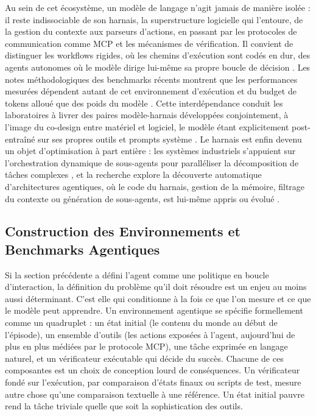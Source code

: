 \documentclass[11pt,a4paper]{article}
\begin{document}
Au sein de cet écosystème, un modèle de langage n'agit jamais de manière isolée : il reste indissociable de son harnais, la superstructure logicielle qui l'entoure, de la gestion du contexte aux parseurs d'actions, en passant par les protocoles de communication comme MCP \cite{anthropic2024mcp} et les mécanismes de vérification. Il convient de distinguer les workflows rigides, où les chemins d'exécution sont codés en dur, des agents autonomes où le modèle dirige lui-même sa propre boucle de décision \cite{anthropic2024agents}. Les notes méthodologiques des benchmarks récents montrent que les performances mesurées dépendent autant de cet environnement d'exécution et du budget de tokens alloué que des poids du modèle \cite{openai2024swebenchverified}. Cette interdépendance conduit les laboratoires à livrer des paires modèle-harnais développées conjointement, à l'image du co-design entre matériel et logiciel, le modèle étant explicitement post-entraîné sur ses propres outils et prompts système \cite{anthropic2024agents, kimik2_2025}. Le harnais est enfin devenu un objet d'optimisation à part entière : les systèmes industriels s'appuient sur l'orchestration dynamique de sous-agents pour paralléliser la décomposition de tâches complexes \cite{kimik2_2025}, et la recherche explore la découverte automatique d'architectures agentiques, où le code du harnais, gestion de la mémoire, filtrage du contexte ou génération de sous-agents, est lui-même appris ou évolué \cite{hu_adas_2025}.

\subsection{Construction des Environnements et Benchmarks Agentiques}

Si la section précédente a défini l'agent comme une politique en boucle d'interaction, la définition du problème qu'il doit résoudre est un enjeu au moins aussi déterminant. C'est elle qui conditionne à la fois ce que l'on mesure et ce que le modèle peut apprendre. Un environnement agentique se spécifie formellement comme un quadruplet : un état initial (le contenu du monde au début de l'épisode), un ensemble d'outils (les actions exposées à l'agent, aujourd'hui de plus en plus médiées par le protocole MCP), une tâche exprimée en langage naturel, et un vérificateur exécutable qui décide du succès. Chacune de ces composantes est un choix de conception lourd de conséquences. Un vérificateur fondé sur l'exécution, par comparaison d'états finaux ou scripts de test, mesure autre chose qu'une comparaison textuelle à une référence. Un état initial pauvre rend la tâche triviale quelle que soit la sophistication des outils.
\end{document}
